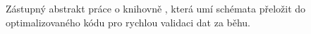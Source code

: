 Zástupný abstrakt práce o knihovně \pvl{}, která umí schémata přeložit do optimalizovaného kódu pro rychlou validaci dat za běhu.
